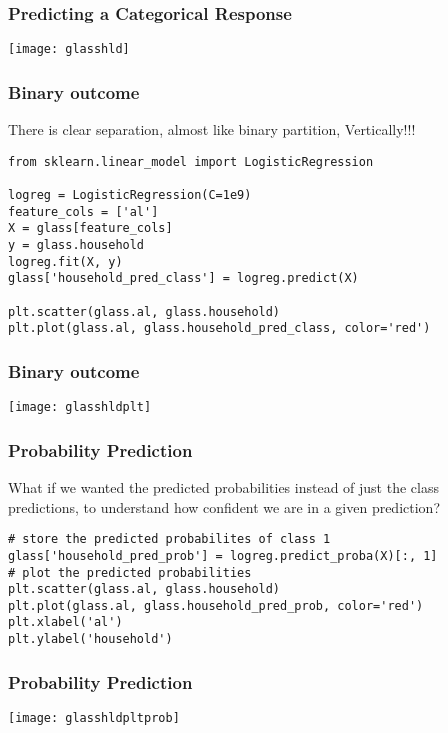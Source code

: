 \begin{frame}[fragile]\frametitle{Predicting a Categorical Response}

\begin{center}
\texttt{[image: glasshld]}
\end{center}
\end{frame}


\begin{frame}[fragile]\frametitle{Binary outcome}
There is clear separation, almost like binary partition, Vertically!!!
\begin{lstlisting}
from sklearn.linear_model import LogisticRegression

logreg = LogisticRegression(C=1e9)
feature_cols = ['al']
X = glass[feature_cols]
y = glass.household
logreg.fit(X, y)
glass['household_pred_class'] = logreg.predict(X)

plt.scatter(glass.al, glass.household)
plt.plot(glass.al, glass.household_pred_class, color='red')
\end{lstlisting}
\end{frame}

\begin{frame}[fragile]\frametitle{Binary outcome}
\begin{center}
\texttt{[image: glasshldplt]}
\end{center}
\end{frame}

\begin{frame}[fragile]\frametitle{Probability Prediction}
What if we wanted the predicted probabilities instead of just the class predictions, to understand how confident we are in a given prediction?
\begin{lstlisting}
# store the predicted probabilites of class 1
glass['household_pred_prob'] = logreg.predict_proba(X)[:, 1]
# plot the predicted probabilities
plt.scatter(glass.al, glass.household)
plt.plot(glass.al, glass.household_pred_prob, color='red')
plt.xlabel('al')
plt.ylabel('household')
\end{lstlisting}
\end{frame}


\begin{frame}[fragile]\frametitle{Probability Prediction}
\begin{center}
\texttt{[image: glasshldpltprob]}
\end{center}
\end{frame}


